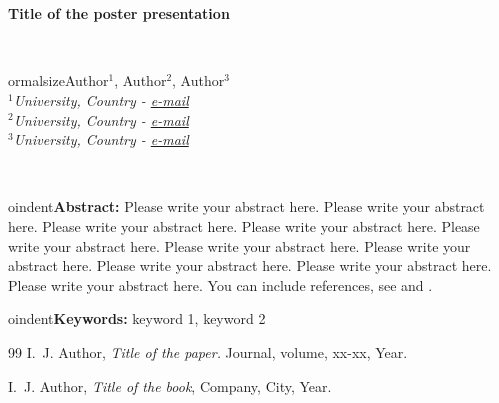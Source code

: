 \documentclass[11pt,reqno]{article}
\begin{document}
\begin{center}

\

\

\Large{\bf Title of the poster presentation} %

\


ormalsize{Author$^{1}$, Author$^{2}$, Author$^{3}$}\\ %

$^{1}$\small{\em University, Country - {\rm\url{e-mail}}}\\ %
$^{2}$\small{\em University, Country - {\rm\url{e-mail}}}\\
$^{3}$\small{\em University, Country - {\rm\url{e-mail}}}

\end{center}
\


oindent\textbf{Abstract:} %
Please write your abstract here. Please write your abstract here. Please write your abstract here. Please write your abstract here. Please write your abstract here. Please write your abstract here. Please write your abstract here. Please write your abstract here. Please write your abstract here. Please write your abstract here. You can include references, see \cite{reference1} and \cite{book}.


\medskip



oindent\textbf{Keywords:} keyword 1, keyword 2




\begin{thebibliography}{99}
 {\sc I.~J. Author,} {\it Title of the paper.}  Journal,
  {volume, xx-xx, Year.}

 {\sc I.~J. Author,} {\it Title of the book}, {Company,
    City, Year.}

\end{thebibliography}
\end{document}
